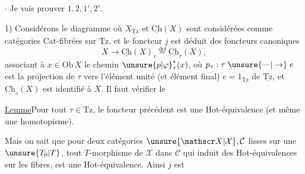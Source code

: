$\cdot$ Je vais prouver $1,2,1',2'$.

1) Considérons le diagramme
où $X_{\underline{\mathrm{Tz}}}$ et $\underline{\mathrm{Ch}}(X)$ sont considérées comme catégories Cat-fibrées sur $\underline{\mathrm{Tz}}$, et le foncteur $j$ est déduit des foncteurs canoniques
\[
X\longrightarrow\underline{\mathrm{Ch}}(X)_\tau\overset{\mathrm{def}}{=}\underline{\mathrm{Ch}}_\tau(X),
\]
associant à  $x\in\mathrm{Ob}\,X$ le chemin  $\unsure{p|\varphi}_\tau^*(x)$, où $p_\tau:\tau\mathrel{\unsure{\text{---}|\to}}e$ est la projection de $\tau$ vers l'élément unité (et élément final) $e=1_{\underline{\mathrm{Tz}}}$ de $\underline{\mathrm{Tz}}$, et $\underline{\mathrm{Ch}}_e(X)$ est identifié à $X$. Il faut vérifier le

\uline{Lemme}\quad Pour tout $\tau\in\mathrm{Tz}$, le foncteur précédent est une Hot-équivalence (et même une  homotopisme).

Mais on sait que pour deux catégories $\unsure{\mathscr X|\mathcal X},\mathcal C$ lisses sur une  $\unsure{T_0|T}$, tout $T$-morphisme de $\mathscr X$ dans $\mathcal C$ qui induit des Hot-équivalences sur les fibres, est une Hot-équivalence. Ainsi $j$ est
